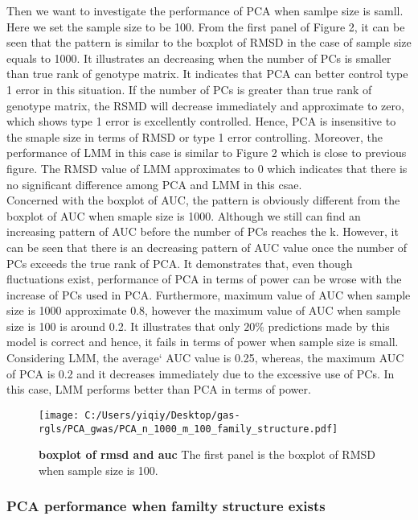 \documentclass[12pt]{article}
\begin{document}
Then we want to investigate the performance of PCA when samlpe size is samll. Here we set the sample size to be 100. From the first panel of Figure 2, it can be seen that the pattern is similar to the boxplot of RMSD in the case of sample size equals to 1000. It illustrates an decreasing when the number of PCs is smaller than true rank of genotype matrix. It indicates that PCA can better control type 1 error in this situation. If the number of PCs is greater than true rank of genotype matrix, the RSMD will decrease immediately and approximate to zero, which shows type 1 error is excellently controlled. Hence, PCA is insensitive to the smaple size in terms of RMSD or type 1 error controlling. Moreover, the performance of LMM in this case is similar to Figure 2 which is close to previous figure. The RMSD value of LMM approximates to 0 which indicates that there is no significant difference among PCA and LMM in this csae.\\

Concerned with the boxplot of AUC, the pattern is obviously different from the boxplot of AUC when smaple size is 1000. Although we still can find an increasing pattern of AUC before the number of PCs reaches the k. However, it can be seen that there is an decreasing pattern of AUC value once the number of PCs exceeds the true rank of PCA. It demonstrates that, even though fluctuations exist, performance of PCA in terms of power can be wrose with the increase of PCs used in PCA. Furthermore, maximum value of AUC when sample size is 1000 approximate 0.8, however the maximum value of AUC when sample size is 100 is around 0.2. It illustrates that only $20\%$ predictions made by this model is correct and hence, it fails in terms of power when sample size is small. Considering LMM, the average` AUC value is 0.25, whereas, the maximum AUC of PCA is 0.2 and it decreases immediately due to the excessive use of PCs. In this case, LMM performs better than PCA in terms of power. \\




\begin{figure}[bp!]
  \centering
  \texttt{[image: C:/Users/yiqiy/Desktop/gas-rgls/PCA\_gwas/PCA\_n\_1000\_m\_100\_family\_structure.pdf]}
  \caption{
    {\bf boxplot of rmsd and auc}
    The first panel is the boxplot of RMSD when sample size is 100.}
  \label{fig:example}
\end{figure}

\subsubsection{PCA performance when familty structure exists}
\end{document}
